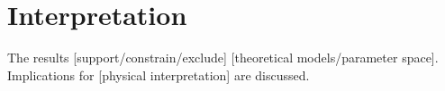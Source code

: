 \section{Interpretation}
\label{sec:RESULTS_INTERPRETATION}

The results [support/constrain/exclude] [theoretical models/parameter space]. Implications for [physical interpretation] are discussed.

